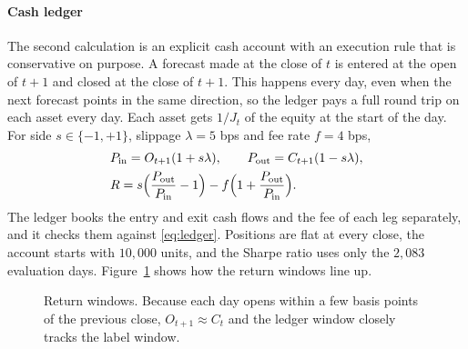 \documentclass[preprint,12pt,authoryear,a4paper]{elsarticle}
\begin{document}
\paragraph{Cash ledger} The second calculation is an explicit cash account with an
execution rule that is conservative on purpose. A forecast made at the close of $t$
is entered at the open of $t+1$ and closed at the close of $t+1$. This happens every
day, even when the next forecast points in the same direction, so the ledger pays a
full round trip on each asset every day. Each asset gets $1/J_t$ of the equity at
the start of the day. For side $s\in\{-1,+1\}$, slippage $\lambda=5$ bps and fee
rate $f=4$ bps,
\begin{equation}
\begin{aligned}
&P_{\text{in}}=O_{t+1}(1+s\lambda),\qquad P_{\text{out}}=C_{t+1}(1-s\lambda),\\
&R=s\Bigl(\frac{P_{\text{out}}}{P_{\text{in}}}-1\Bigr)-f\Bigl(1+\frac{P_{\text{out}}}{P_{\text{in}}}\Bigr).
\end{aligned}
\label{eq:ledger}
\end{equation}
The ledger books the entry and exit cash flows and the fee of each leg separately,
and it checks them against \eqref{eq:ledger}. Positions are flat at every close, the
account starts with $10{,}000$ units, and the Sharpe ratio uses only the $2{,}083$
evaluation days. Figure~\ref{fig:timing} shows how the return windows line up.

\begin{figure}[htbp]\centering
{}
\caption{Return windows. Because each day opens within a few basis points of the
previous close, $O_{t+1}\approx C_t$ and the ledger window closely tracks the label
window.}
\label{fig:timing}
\end{figure}
\end{document}
